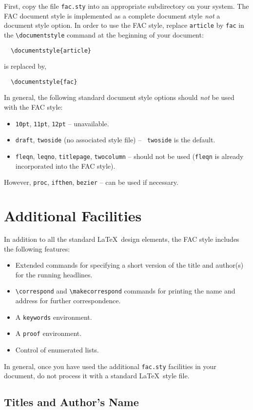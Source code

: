 First, copy the file \verb"fac.sty" into an appropriate subdirectory on
your system.
The FAC document style is implemented as a complete document style {\em
not\/} a document style option.
In order to use the FAC style, replace \verb"article" by \verb"fac" in the
\verb"\documentstyle" command at the beginning of your document:
%
\begin{verbatim}
  \documentstyle{article}
\end{verbatim}
is replaced by,
\begin{verbatim}
  \documentstyle{fac}
\end{verbatim}
%
In general, the following standard document style options should {\em
not\/} be used with the FAC style:
%
\begin{itemize}
  \item {\tt 10pt}, {\tt 11pt}, {\tt 12pt} -- unavailable.
  \item {\tt draft}, {\tt twoside} (no associated style file) -- {\tt
     twoside} is the default.
  \item {\tt fleqn}, {\tt leqno}, {\tt titlepage}, {\tt twocolumn} --
        should not be used (\verb"fleqn" is already incorporated into
        the FAC style).
\end{itemize}
%
However, {\tt proc}, {\tt ifthen}, {\tt bezier} -- can be used if
necessary.

\section{Additional Facilities}

In addition to all the standard \LaTeX\ design elements, the FAC style
includes the following features:
%
\begin{itemize}
  \item Extended commands for specifying a short version of the title and
        author(s) for the running headlines.
  \item \verb"\correspond" and \verb"\makecorrespond" commands for printing
     the name and address for further correspondence.
  \item A \verb"keywords" environment.
  \item A \verb"proof" environment.
  \item Control of enumerated lists.
\end{itemize}
%
In general, once you have used the additional \verb"fac.sty"
facilities in your document, do not process it with a standard \LaTeX\
style file.

\subsection{Titles and Author's Name}

